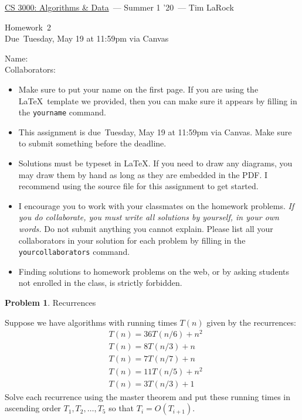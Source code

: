 \documentclass[11pt]{article}
\newcommand{\yourname}{}
\newcommand{\yourcollaborators}{}
\theoremstyle{definition}
\theoremstyle{theorem}
\newtheorem{prob}{Problem}
\newcommand{\course}{\href{https://tlarock.github.io/teaching/cs3000/syllabus.html}{CS 3000: Algorithms \& Data}}
\newcommand{\instructor}{Tim LaRock}
\newcommand{\semester}{Summer 1 '20}
\newcommand{\hwnum}{2}
\newcommand{\hwdue}{Tuesday, May 19 at 11:59pm via Canvas}
\begin{document}
{\Large 
\begin{center} \course\ --- \semester\ --- \instructor \end{center}}
{\large
\vspace{10pt}
\noindent Homework~\hwnum \vspace{2pt}\\
Due~\hwdue}

\bigskip
{\large
\noindent Name: \yourname \vspace{2pt}\\ Collaborators: \yourcollaborators}

\vspace{15pt}
\begin{itemize}

\item Make sure to put your name on the first page.  If you are using the \LaTeX~template we provided, then you can make sure it appears by filling in the \texttt{yourname} command.

\item This assignment is due~\hwdue.  Make sure to submit something before the deadline.

\item Solutions must be typeset in \LaTeX.  If you need to draw any diagrams, you may draw them by hand as long as they are embedded in the PDF.  I recommend using the source file for this assignment to get started.

\item I encourage you to work with your classmates on the homework problems. \emph{If you do collaborate, you must write all solutions by yourself, in your own words.}  Do not submit anything you cannot explain.  Please list all your collaborators in your solution for each problem by filling in the \texttt{yourcollaborators} command.

\item Finding solutions to homework problems on the web, or by asking students not enrolled in the class, is strictly forbidden.

\end{itemize}

\newpage
\begin{prob} Recurrences \end{prob}

Suppose we have algorithms with running times $T(n)$ given by the recurrences:
\begin{align*}
&T(n) = 36 T(n/6) + n^2 \\
&T(n) = 8 T(n/3) + n \\
&T(n) = 7 T(n/7) + n \\
&T(n) = 11 T(n/5) + n^2\\
&T(n) = 3 T(n/3) + 1
\end{align*}
Solve each recurrence using the master theorem and put these running times in ascending order $T_1, T_2,\dots,T_5$ so that $T_i = O(T_{i+1})$.
\end{document}
